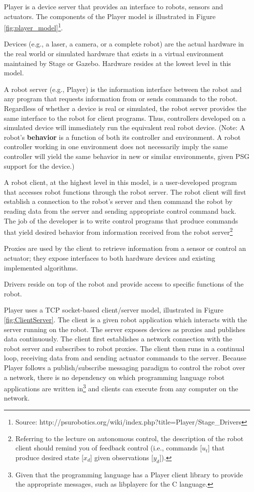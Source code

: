  
Player is a device server that provides an interface to robots, sensors and actuators. The components of the Player model is illustrated in Figure \ref{fig:player_model}\footnote{Source: http://psurobotics.org/wiki/index.php?title=Player/Stage\_Drivers}.

Devices (e.g., a laser, a camera, or a complete robot) are the actual hardware in the real world or simulated hardware that exists in a virtual environment maintained by Stage or Gazebo. Hardware resides at the lowest level in this model.

A robot server (e.g., Player) is the information interface between the robot and any program that requests information from or sends commands to the robot.  Regardless of whether a device is real or simulated, the robot server provides the same interface to the robot for client programs.  Thus, controllers developed on a simulated device will immediately run the equivalent real robot device.  (Note: A robot's {\bf behavior} is a function of both its controller and environment.  A robot controller working in one environment does not necessarily imply the same controller will yield the same behavior in new or similar environments, given PSG support for the device.)

A robot client, at the highest level in this model, is a user-developed program that accesses robot functions through the robot server.  The robot client will first establish a connection to the robot's server and then command the robot by reading data from the server and sending appropriate control command back.  The job of the developer is to write control programs that produce commands that yield desired behavior from information received from the robot server\footnote{Referring to the lecture on autonomous control, the description of the robot client should remind you of feedback control (i.e., commands [$u_t$] that produce desired state [$x_d$] given observations [$y_d$]).}  

Proxies are used by the client to retrieve information from a sensor or control an actuator; they expose interfaces to both hardware devices and existing implemented algorithms. 

Drivers reside on top of the robot and provide access to specific functions of the robot. 

Player uses a TCP socket-based client/server model, illustrated in Figure \ref{fig:ClientServer}. The client is a given robot application which interacts with the server running on the robot. The server exposes devices as proxies and publishes data continuously. The client first establishes a network connection with the robot server and subscribes to robot proxies. The client then runs in a continual loop, receiving data from and sending actuator commands to the server. Because Player follows a publish/subscribe messaging paradigm to control the robot over a network, there is no dependency on which programming language robot applications are written in\footnote{Given that the programming language has a Player client library to provide the appropriate messages, such as libplayerc for the C language.} and clients can execute from any computer on the network.
 
